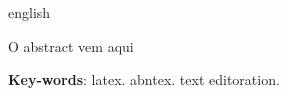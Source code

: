 \begin{resumo}[Abstract]
 \begin{otherlanguage*}{english}
   
   O abstract vem aqui

   \vspace{\onelineskip}
 
   \noindent 
   \textbf{Key-words}: latex. abntex. text editoration.
 \end{otherlanguage*}
\end{resumo}